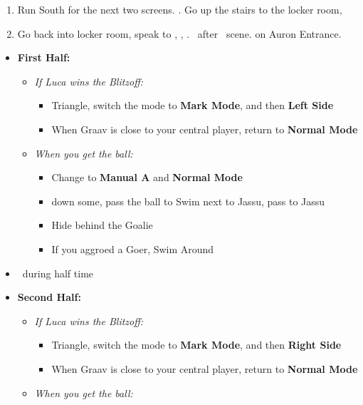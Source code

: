 \begin{enumerate}[resume]
  \item Run South for the next two screens. \save. Go up the stairs to the locker room, \sd
  \item Go back into locker room, speak to \wakka, \sd, \cs[1:20]. \sd\ after \lulu\ scene. \cs[1:40] on Auron Entrance.
\end{enumerate}
\begin{blitzball}
  \begin{itemize}
  \item \textbf{First Half:}
  \begin{itemize}
    \item \textit{If Luca wins the Blitzoff:}
          \begin{itemize}
            \item Triangle, switch the mode to \textbf{Mark Mode}, and then \textbf{Left Side}
            \item When Graav is close to your central player, return to \textbf{Normal Mode}
          \end{itemize}
    \item \textit{When you get the ball:}
          \begin{itemize}
            \item Change to \textbf{Manual A} and \textbf{Normal Mode}
            \item down some, pass the ball to \tidus
            \tidusf Swim next to Jassu, pass to Jassu
            \item Hide behind the Goalie
            \item If you aggroed a Goer, Swim Around
          \end{itemize}
          \end{itemize}
    \item \sd\ during half time
    \item \textbf{Second Half:}
    	\begin{itemize}
    \item \textit{If Luca wins the Blitzoff:}
          \begin{itemize}
            \item Triangle, switch the mode to \textbf{Mark Mode}, and then \textbf{Right Side}
            \item When Graav is close to your central player, return to \textbf{Normal Mode}
          \end{itemize}
    \item \textit{When you get the ball:}

\end{itemize}
\end{itemize}
\end{blitzball}
